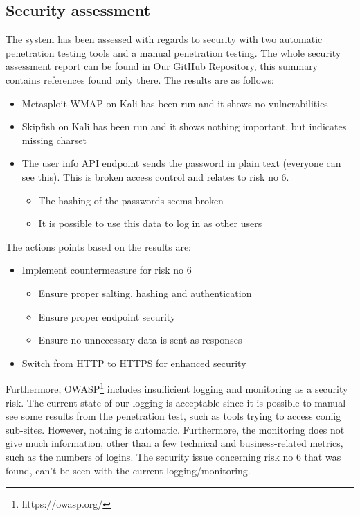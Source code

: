 \documentclass[10pt]{article}
\begin{document}
\subsection{Security assessment}
The system has been assessed with regards to security with two automatic penetration testing tools and a manual penetration testing. The whole security assessment report can be found in \href{https://github.com/Arklaide/devopsITUproject/blob/main/report/sub-reports/SecurityAssessment.md}{Our GitHub Repository}, this summary contains references found only there. The results are as follows:

\begin{itemize}
    \item Metasploit WMAP on Kali has been run and it shows no vulnerabilities
    \item Skipfish on Kali has been run and it shows nothing important, but indicates missing charset
    \item The user info API endpoint sends the password in plain text (everyone can see this). This is broken access control and relates to risk no 6.
    \begin{itemize}
        \item The hashing of the passwords seems broken
        \item It is possible to use this data to log in as other users
    \end{itemize}
\end{itemize}

The actions points based on the results are:
\begin{itemize}
    \item Implement countermeasure for risk no 6
    \begin{itemize}
    \item Ensure proper salting, hashing and authentication 
    \item Ensure proper endpoint security
    \item Ensure no unnecessary data is sent as responses
    \end{itemize}
    \item Switch from HTTP to HTTPS for enhanced security
\end{itemize}

Furthermore, OWASP\footnote{https://owasp.org/} includes insufficient logging and monitoring as a security risk. The current state of our logging is acceptable since it is possible to manual see some results from the penetration test, such as tools trying to access config sub-sites. However, nothing is automatic. Furthermore, the monitoring does not give much information, other than a few technical and business-related metrics, such as the numbers of logins. The security issue concerning risk no 6 that was found, can't be seen with the current logging/monitoring.
\end{document}
